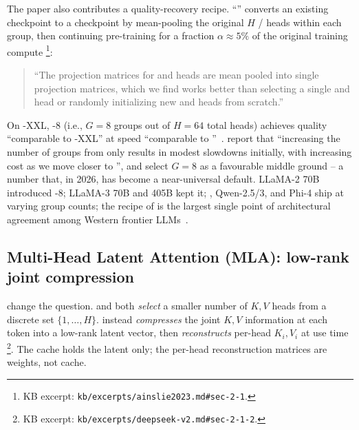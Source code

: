 The  paper also contributes a quality-recovery recipe.
``'' converts an existing  checkpoint to a 
checkpoint by mean-pooling the original $H$ / heads within
each group, then continuing pre-training for a fraction
$\alpha \approx 5\%$ of the original training compute%
\footnote{KB excerpt: \texttt{kb/excerpts/ainslie2023.md\#sec-2-1}.}:
\begin{quote}
``The projection matrices for  and  heads are mean pooled
into single projection matrices, which we find works better than
selecting a single  and  head or randomly initializing new
 and  heads from scratch.''~\citep[\S 2.1]{ainslie2023}
\end{quote}
On -XXL, -8 (i.e., $G = 8$ groups out of $H = 64$ total 
heads) achieves quality ``comparable to -XXL'' at speed
``comparable to ''~\citep[\S 3.2]{ainslie2023}. \citet[\S
3.3]{ainslie2023} report that ``increasing the number of groups
from  only results in modest slowdowns initially, with increasing
cost as we move closer to '', and select $G = 8$ as a favourable
middle ground -- a number that, in 2026, has become a near-universal
default. LLaMA-2 70B introduced -8; LLaMA-3 70B and 405B kept
it; , Qwen-2.5/3, and Phi-4 ship  at varying group counts;
the recipe of \citet{ainslie2023} is the largest single point of
architectural agreement among Western frontier
LLMs~\citep{touvron2023, jiang2023, meta-llama3, qwen3, phi4}.

\subsection{Multi-Head Latent Attention (MLA): low-rank joint compression}
\label{sec:attn-mla}

\citet{deepseek-v2} change the question.  and  both
\emph{select} a smaller number of $K, V$ heads from a discrete set
$\{1, \ldots, H\}$.  instead \emph{compresses} the joint $K, V$
information at each token into a low-rank latent vector, then
\emph{reconstructs} per-head $K_i, V_i$ at use time%
\footnote{KB excerpt: \texttt{kb/excerpts/deepseek-v2.md\#sec-2-1-2}.}.
The cache holds the latent only; the per-head reconstruction
matrices are weights, not cache.

